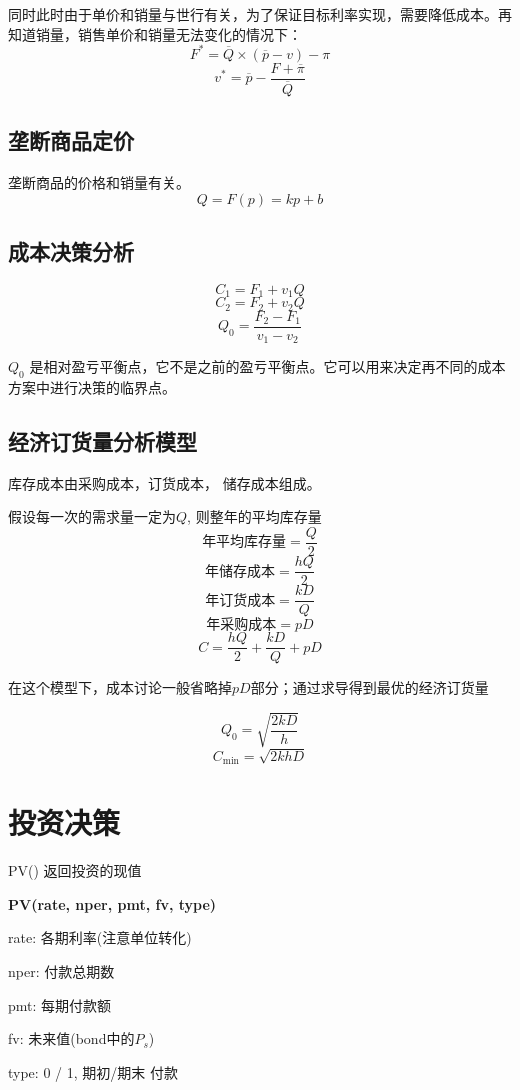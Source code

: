 \documentclass[10pt, a4paper]{article}
\begin{document}
        同时此时由于单价和销量与世行有关，为了保证目标利率实现，需要降低成本。再知道销量，销售单价和销量无法变化的情况下： 
        $$F^{*} = \overline{Q} \times (\overline{p} - v) - \pi$$
        $$v^{*} = \overline{p} - \frac{F + \overline{\pi}}{\overline{Q}}$$
    \subsection{垄断商品定价}
        垄断商品的价格和销量有关。 
            $$Q = F(p) = kp + b$$
    \subsection{成本决策分析}
        $$C_1 = F_1 + v_1Q$$
        $$C_2 = F_2 + v_2Q$$
        $$Q_0 = \frac{F_2 - F_1}{v_1 - v_2}$$

        $Q_0$ 是相对盈亏平衡点，它不是之前的盈亏平衡点。它可以用来决定再不同的成本方案中进行决策的临界点。 

    \subsection{经济订货量分析模型}
        库存成本由采购成本，订货成本， 储存成本组成。

        假设每一次的需求量一定为$Q$, 则整年的平均库存量
        $$\text{年平均库存量} = \frac{Q}{2}$$
        $$\text{年储存成本} = \frac{hQ}{2}$$
        $$\text{年订货成本} = \frac{kD}{Q}$$
        $$\text{年采购成本} = pD$$
        $$C = \frac{hQ}{2} + \frac{kD}{Q} + pD$$


        在这个模型下，成本讨论一般省略掉$pD$部分；通过求导得到最优的经济订货量

        $$Q_0 = \sqrt{\frac{2kD}{h}}$$
        $$C_{\text{min}} = \sqrt{2khD}$$

\section{投资决策}

PV() 返回投资的现值
\begin{center}
    \textbf{PV(rate, nper, pmt, fv, type)}
    
    rate: 各期利率(注意单位转化)
    
    nper: 付款总期数

    pmt: 每期付款额

    fv: 未来值(bond中的$P_s$)

    type: 0 / 1, 期初/期末 付款

\end{center}
\end{document}
